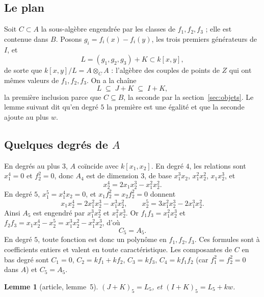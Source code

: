 \documentclass[11pt,a4paper]{amsart}
\theoremstyle{definition}
\theoremstyle{plain}
\newtheorem*{lemme}{Lemme}
\theoremstyle{remark}
\begin{document}
\subsection{Le plan}

Soit $C \subset A$ la sous-algèbre engendrée par les classes de $f_1, f_2, f_3$ ; elle est contenue dans $B$. Posons $g_i = f_i(x) - f_i(y)$, les trois premiers générateurs de $I$, et
\[
L = (g_1, g_2, g_3) + K \subset k[x, y],
\]
de sorte que $k[x, y]/L = A \otimes_C A$ : l'algèbre des couples de points de $Z$ qui ont mêmes valeurs de $f_1, f_2, f_3$. On a la chaîne
\[
L \;\subseteq\; J + K \;\subseteq\; I + K,
\]
la première inclusion parce que $C \subseteq B$, la seconde par la section~\ref{sec:objets}. Le lemme suivant dit qu'en degré $5$ la première est une égalité et que la seconde ajoute au plus $w$.

\subsection{Quelques degrés de $A$}

En degrés au plus $3$, $A$ coïncide avec $k[x_1, x_2]$. En degré $4$, les relations sont $x_1^4 = 0$ et $f_2^2 = 0$, donc $A_4$ est de dimension $3$, de base $x_1^3x_2$, $x_1^2x_2^2$, $x_1x_2^3$, et
\[
x_2^4 = 2x_1x_2^3 - x_1^2x_2^2. \tag{1}
\]
En degré $5$, $x_1^5 = x_1^4x_2 = 0$, et $x_1 f_2^2 = x_2 f_2^2 = 0$ donnent
\[
x_1x_2^4 = 2x_1^2x_2^3 - x_1^3x_2^2, \qquad x_2^5 = 3x_1^2x_2^3 - 2x_1^3x_2^2.
\]
Ainsi $A_5$ est engendré par $x_1^3x_2^2$ et $x_1^2x_2^3$. Or $f_1f_3 = x_1^2x_2^3$ et $f_2f_3 = x_1x_2^4 - x_2^5 = x_1^3x_2^2 - x_1^2x_2^3$, d'où
\[
C_5 = A_5. \tag{2}
\]
En degré $5$, toute fonction est donc un polynôme en $f_1, f_2, f_3$. Ces formules sont à coefficients entiers et valent en toute caractéristique. Les composantes de $C$ en bas degré sont $C_1 = 0$, $C_2 = kf_1 + kf_2$, $C_3 = kf_3$, $C_4 = kf_1f_2$ (car $f_1^2 = f_2^2 = 0$ dans $A$) et $C_5 = A_5$.

\begin{lemme}[article, lemme~5]
$(J + K)_5 = L_5$, et $(I + K)_5 = L_5 + kw$.
\end{lemme}
\end{document}

